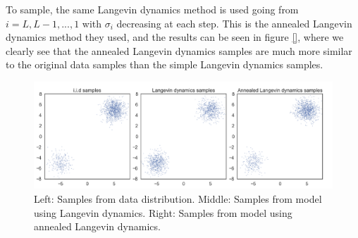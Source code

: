 \documentclass{article}
\begin{document}
To sample, the same Langevin dynamics method is used going from $i = L, L-1, ..., 1$ with $\sigma_i$ decreasing at each step. This is the annealed Langevin dynamics method they used, and the results can be seen in figure \ref{}, where we clearly see that the annealed Langevin dynamics samples are much more similar to the original data samples than the simple Langevin dynamics samples. \cite{songblog,song2020generative} \\ 
\begin{figure}[h]
  \begin{center}
    \includegraphics[width=\textwidth]{images/samples.png}
    \caption{Left: Samples from data distribution. Middle: Samples from model using Langevin dynamics. Right: Samples from model using annealed Langevin dynamics. \cite{song2020generative}} 
  \end{center}
\end{figure}
\end{document}
